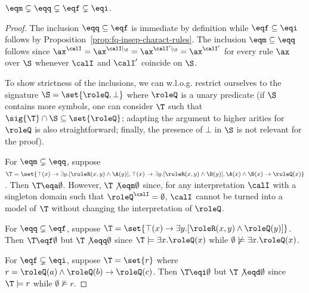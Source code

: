 \begin{proposition} \label{prop:insep-rel-hierarchy}
${\eqm}\subsetneq{\eqq}\subsetneq{\eqf}\subsetneq{\eqi}$.
\end{proposition}
\begin{proof}
  The inclusion ${\eqq}\subseteq{\eqf}$ is immediate by definition
  while ${\eqf}\subseteq{\eqi}$ follows by
  Proposition~\ref{prop:fq-insep-charact-rules}. The inclusion
  ${\eqm}\subseteq{\eqq}$ follows since
  $\ax^{\calI}=\ax^{\calI|_{\S}}=\ax^{\calI'|_{\S}}=\ax^{\calI'}$ for
  every rule $\ax$ over $\S$ whenever $\calI$ and $\calI'$ coincide on
  $\S$.

  To show strictness of the inclusions, we can w.l.o.g. restrict
  ourselves to the signature $\S=\set{\roleQ,\bot}$ where $\roleQ$ is
  a unary predicate (if $\S$ contains more symbols, one can consider
  $\T$ such that $\sig{\T}\cap\S\subseteq\set{\roleQ}$; adapting the
  argument to higher arities for $\roleQ$ is also straightforward;
  finally, the presence of $\bot$ in $\S$ is not relevant for the
  proof).

  For ${\eqm}\subsetneq{\eqq}$, suppose $\T=\set{\top(x)\to\exists
  y.[\roleR(x,y)\land\A(y)],\top(x)\to\exists y.[\roleR(x,y)\land\B(y)],\A(x)\land\B(x)\to\roleQ(x)}$. 
  Then $\T\eqa\emptyset$.
  However, $\T\not\eqm\emptyset$ since, for any interpretation $\calI$ with a singleton domain 
  such that $\roleQ^{\calI} = \emptyset$, $\calI$ cannot be turned into a model of $\T$ 
  without changing the interpretation of $\roleQ$.

  For ${\eqq}\subsetneq{\eqf}$, suppose $\T=\set{\top(x)\to\exists y.[\roleR(x,y)\land\roleQ(y)]}$. 
  Then $\T\eqf\emptyset$ but $\T\not\eqq\emptyset$ since $\T\models\exists x.\roleQ(x)$ 
  while $\emptyset\not\models\exists x.\roleQ(x)$.

%

  For ${\eqf}\subsetneq{\eqi}$, suppose $\T=\set{r}$ where
  $r=\roleQ(a)\land\roleQ(b)\to\roleQ(c)$. Then $\T\eqi\emptyset$ but
  $\T\not\eqd\emptyset$ since $\T\models r$ while $\emptyset\not\models r$.
  \end{proof}











